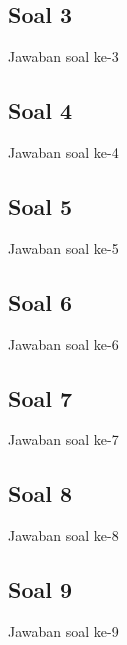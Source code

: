 \subsection{Soal 3}
Jawaban soal ke-3



\subsection{Soal 4}
Jawaban soal ke-4



\subsection{Soal 5}
Jawaban soal ke-5



\subsection{Soal 6}
Jawaban soal ke-6



\subsection{Soal 7}
Jawaban soal ke-7



\subsection{Soal 8}
Jawaban soal ke-8



\subsection{Soal 9}
Jawaban soal ke-9

